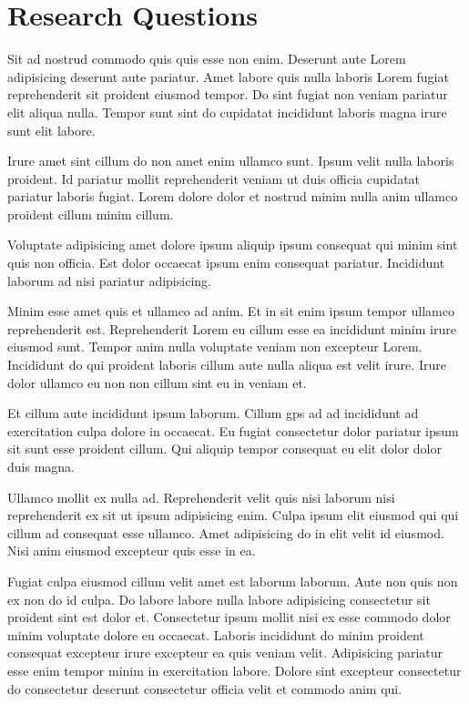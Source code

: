 \chapter{Research Questions}
\label{ch:RQ}


Sit ad nostrud commodo quis quis esse non enim. Deserunt aute Lorem adipisicing deserunt aute pariatur. 
Amet labore quis nulla laboris Lorem fugiat reprehenderit sit proident eiusmod tempor. 
Do sint fugiat non veniam pariatur elit aliqua nulla. 
Tempor sunt sint do cupidatat incididunt laboris magna irure sunt elit labore.

Irure amet sint cillum do non amet enim ullamco sunt. 
Ipsum velit nulla laboris proident. 
Id pariatur mollit reprehenderit veniam ut duis officia cupidatat pariatur laboris fugiat. 
Lorem dolore dolor et nostrud minim nulla anim ullamco proident cillum minim cillum. 

Voluptate adipisicing amet dolore ipsum aliquip ipsum consequat qui minim sint quis non officia. 
Est dolor occaecat ipsum enim consequat pariatur. Incididunt laborum ad nisi pariatur adipisicing.

Minim esse amet quis et ullamco ad anim. 
Et in sit enim ipsum tempor ullamco reprehenderit est. 
Reprehenderit Lorem eu cillum esse ea incididunt minim irure eiusmod sunt. 
Tempor anim nulla voluptate veniam non excepteur Lorem. 
Incididunt do qui proident laboris cillum aute nulla aliqua est velit irure. 
Irure dolor ullamco eu non non cillum sint eu in veniam et.

Et cillum aute incididunt ipsum laborum. Cillum \gls{gps} ad ad incididunt ad exercitation culpa dolore in occaecat. 
Eu fugiat consectetur dolor pariatur ipsum sit sunt esse proident cillum. 
Qui aliquip tempor consequat eu elit dolor dolor duis magna.

Ullamco mollit ex nulla ad. 
Reprehenderit velit quis nisi laborum nisi reprehenderit ex sit ut ipsum adipisicing enim. 
Culpa ipsum elit eiusmod qui qui cillum ad consequat esse ullamco. 
Amet adipisicing do in elit velit id eiusmod. Nisi anim eiusmod excepteur quis esse in ea.

Fugiat culpa eiusmod cillum velit amet est laborum laborum. 
Aute non quis non ex non do id culpa. 
Do labore labore nulla labore adipisicing consectetur sit proident sint est dolor et. 
Consectetur ipsum mollit nisi ex esse commodo dolor minim voluptate dolore eu occaecat. 
Laboris incididunt do minim proident consequat excepteur irure excepteur ea quis veniam velit. 
Adipisicing pariatur esse enim tempor minim in exercitation labore. 
Dolore sint excepteur consectetur do consectetur deserunt consectetur officia velit et commodo anim qui.

